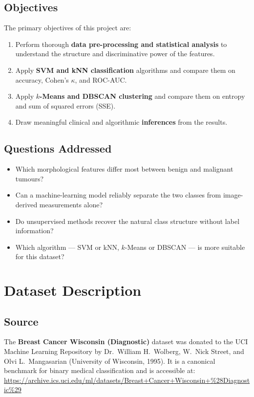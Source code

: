 \documentclass[12pt,a4paper]{article}
\begin{document}
\subsection{Objectives}
The primary objectives of this project are:
\begin{enumerate}[leftmargin=2em]
  \item Perform thorough \textbf{data pre-processing and statistical analysis} to
        understand the structure and discriminative power of the features.
  \item Apply \textbf{SVM and kNN classification} algorithms and compare them on
        accuracy, Cohen's $\kappa$, and ROC-AUC.
  \item Apply \textbf{$k$-Means and DBSCAN clustering} and compare them on entropy
        and sum of squared errors (SSE).
  \item Draw meaningful clinical and algorithmic \textbf{inferences} from the results.
\end{enumerate}

\subsection{Questions Addressed}
\begin{itemize}[leftmargin=2em]
  \item Which morphological features differ most between benign and malignant tumours?
  \item Can a machine-learning model reliably separate the two classes from image-derived
        measurements alone?
  \item Do unsupervised methods recover the natural class structure without label
        information?
  \item Which algorithm --- SVM or kNN, $k$-Means or DBSCAN --- is more suitable for
        this dataset?
\end{itemize}

\section{Dataset Description}

\subsection{Source}
The \textbf{Breast Cancer Wisconsin (Diagnostic)} dataset was donated to the UCI Machine
Learning Repository by Dr.\ William H.\ Wolberg, W.\ Nick Street, and Olvi L.\ Mangasarian
(University of Wisconsin, 1995). It is a canonical benchmark for binary medical
classification and is accessible at:\\
\url{https://archive.ics.uci.edu/ml/datasets/Breast+Cancer+Wisconsin+%28Diagnostic%29}
\end{document}
